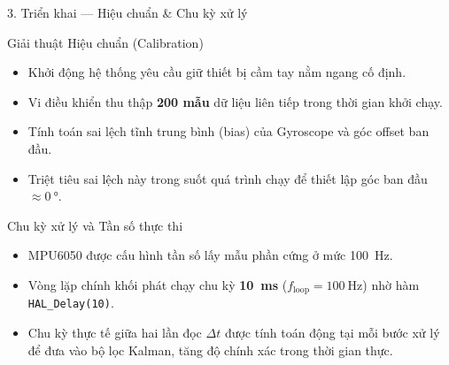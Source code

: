 \documentclass[aspectratio=169, 10pt]{beamer}
\begin{document}
\begin{frame}{3. Triển khai — Hiệu chuẩn \& Chu kỳ xử lý}
  \begin{block}{Giải thuật Hiệu chuẩn (Calibration)}
    \small
    \begin{itemize}
      \item Khởi động hệ thống yêu cầu giữ thiết bị cầm tay nằm ngang cố định.
      \item Vi điều khiển thu thập \textbf{\num{200} mẫu} dữ liệu liên tiếp trong thời gian khởi chạy.
      \item Tính toán sai lệch tĩnh trung bình (bias) của Gyroscope và góc offset ban đầu.
      \item Triệt tiêu sai lệch này trong suốt quá trình chạy để thiết lập góc ban đầu $\approx \qty{0}{\degree}$.
    \end{itemize}
  \end{block}
  \begin{block}{Chu kỳ xử lý và Tần số thực thi}
    \small
    \begin{itemize}
      \item MPU6050 được cấu hình tần số lấy mẫu phần cứng ở mức \qty{100}{\hertz}.
      \item Vòng lặp chính khối phát chạy chu kỳ \textbf{\qty{10}{\ms}} ($f_{\text{loop}} = \qty{100}{\hertz}$) nhờ hàm \texttt{HAL\_Delay(10)}.
      \item Chu kỳ thực tế giữa hai lần đọc $\Delta t$ được tính toán động tại mỗi bước xử lý để đưa vào bộ lọc Kalman, tăng độ chính xác trong thời gian thực.
    \end{itemize}
  \end{block}
\end{frame}
\end{document}
